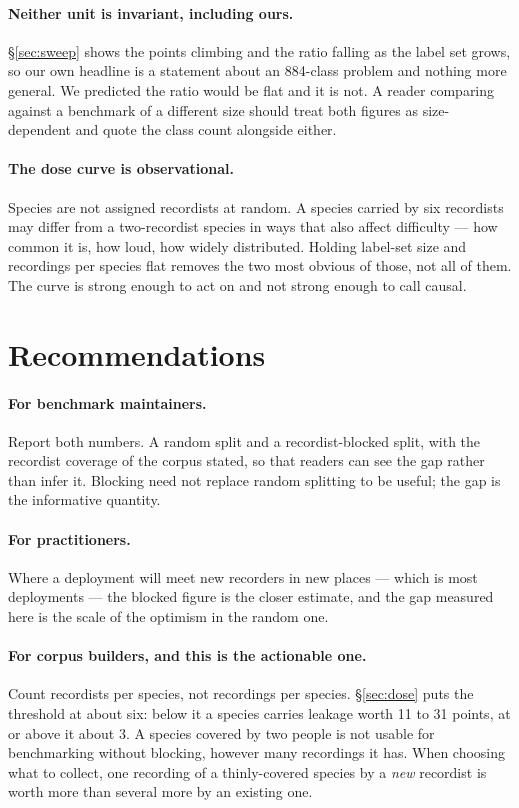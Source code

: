 \documentclass[10pt,twocolumn,a4paper]{article}
\begin{document}
\paragraph{Neither unit is invariant, including ours.} \S\ref{sec:sweep} shows the points
climbing and the ratio falling as the label set grows, so our own headline is a statement about an
884-class problem and nothing more general. We predicted the ratio would be flat and it is not.
A reader comparing against a benchmark of a different size should treat both figures as
size-dependent and quote the class count alongside either.

\paragraph{The dose curve is observational.} Species are not assigned recordists at random. A
species carried by six recordists may differ from a two-recordist species in ways that also affect
difficulty --- how common it is, how loud, how widely distributed. Holding label-set size and
recordings per species flat removes the two most obvious of those, not all of them. The curve is
strong enough to act on and not strong enough to call causal.

\section{Recommendations}
\label{sec:what}

\paragraph{For benchmark maintainers.} Report both numbers. A random split and a
recordist-blocked split, with the recordist coverage of the corpus stated, so that readers can
see the gap rather than infer it. Blocking need not replace random splitting to be useful;
the gap is the informative quantity.

\paragraph{For practitioners.} Where a deployment will meet new recorders in new places ---
which is most deployments --- the blocked figure is the closer estimate, and the gap measured
here is the scale of the optimism in the random one.

\paragraph{For corpus builders, and this is the actionable one.} Count recordists per species,
not recordings per species. \S\ref{sec:dose} puts the threshold at about six: below it a species
carries leakage worth 11 to 31 points, at or above it about 3. A species covered by two people is
not usable for benchmarking without blocking, however many recordings it has. When choosing what
to collect, one recording of a thinly-covered species by a \emph{new} recordist is worth more than
several more by an existing one.
\end{document}
